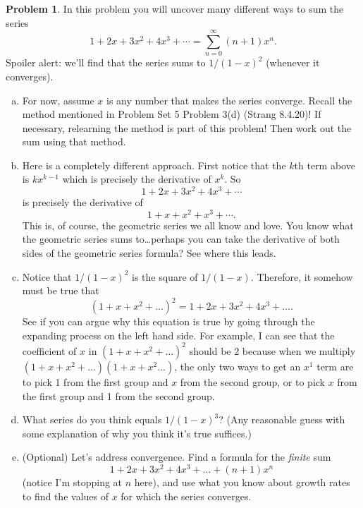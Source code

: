 \documentclass[11pt,oneside]{amsart}
\theoremstyle{definition}
\newtheorem{problem}{Problem}
\theoremstyle{plain}
\begin{document}
\begin{problem}
In this problem you will uncover many different ways to sum the series
\[1+2x+3x^2+4x^3+\cdots=\sum_{n=0}^\infty (n+1)x^n.\]
Spoiler alert: we'll find that the series sums to $1/(1-x)^2$ (whenever it converges).
\begin{enumerate}[(a)]
  \item For now, assume $x$ is any number that makes the series converge. Recall the method mentioned in Problem Set 5 Problem 3(d) (Strang 8.4.20)! If necessary, relearning the method is part of this problem! Then work out the sum using that method.
  \item Here is a completely different approach. First notice that the $k$th term above is $kx^{k-1}$ which is precisely the derivative of $x^k$. So
        \[1+2x+3x^2+4x^3+\cdots\]
        is precisely the derivative of
        \[1+x+x^2+x^3+\cdots.\]
        This is, of course, the geometric series we all know and love. You know what the geometric series sums to\ldots perhaps you can take the derivative of both sides of the geometric series formula? See where this leads.
  \item Notice that $1/(1-x)^2$ is the square of $1/(1-x)$. Therefore, it somehow must be true that
        \[(1+x+x^2+\dots)^2=1+2x+3x^2+4x^3+\dots.\]
        See if you can argue why this equation is true by going through the expanding process on the left hand side. For example, I can see that the coefficient of $x$ in $(1+x+x^2+\dots)^2$ should be 2 because when we multiply $(1+x+x^2+\dots)(1+x+x^2\dots)$, the only two ways to get an $x^1$ term are to pick 1 from the first group and $x$ from the second group, or to pick $x$ from the first group and 1 from the second group.
  \item What series do you think equals $1/(1-x)^3$? (Any reasonable guess with some explanation of why you think it's true suffices.)
  \item (Optional) Let's address convergence. Find a formula for the \emph{finite} sum
        \[1+2x+3x^2+4x^3+\dots+(n+1)x^n\]
        (notice I'm stopping at $n$ here), and use what you know about growth rates to find the values of $x$ for which the series converges.
\end{enumerate}
\end{problem}
\end{document}

